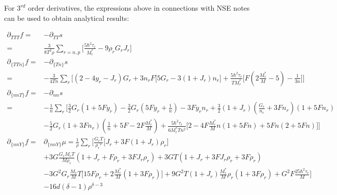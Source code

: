 \documentclass[preprint,prc,preprintnumbers,superscriptaddress,amsmath,amssymb,floatfix]{revtex4-1}
\begin{document}
For $3^{rd}$ order derivatives, the expressions above in connections with NSE notes can be used to obtain analytical results:
\begin{mdframed}
\begin{equation}
 \begin{split}
  \partial_{TTT}f=&-\partial_{TT}s\\
=&\frac{3}{8T^2\rho}\sum_{r={n,p}}\big[\frac{5\hbar^2\tau_r}{M_r^{*}}-9\rho_rG_r J_r\big]\\
  \partial_{\{TTn\}}f=&-\partial_{\{Tn\}}s\\
  =&-\frac{3}{4T n}\sum_r\Big[(2-4y_r-J_r)G_r+3n_r F\big[5G_r-3(1+J_r)n_r\big]+\frac{5\hbar^2\tau_r}{TM_r^{*}}\big[F(2\frac{M^{*}_r}{M}-5)-\frac{1}{3n}\big]\Big]\\
  \partial_{\{nnT\}}f=&-\partial_{nn}s\\
  =&-\frac{1}{n}\sum_r \Big[\frac{3}{2} {G_r} (1+5 F {y_r})-\frac{3}{2} {G_r}(5 F {y_r}+\frac{1}{n })-3 F {y_r} {n_r}+\frac{3}{2} (1+{J_r}) (\frac{{G_r}}{{n_r}}+3 F {n_r}) (1+5 F {n_r})\\
 &-\frac{5}{2} G_r (1+ 3 F n_r)(\frac{1}{n}+5 F-2 F \frac{M_r^{*}}{M})+\frac{5 \hbar^2 \tau_r}{6 M_r^{*} T n^2}\big[2-4 F \frac{M_r^{*}}{M}n (1+5 F n)+5 F n (2 + 5 F n)\big]\Big]\\
 \partial_{\{nnY\}}f=&\partial_{\{nnY\}}\mu=\frac{1}{\rho}\sum_r\Big[\frac{{G_r} T}{{\rho_r}^2} \big[{J_r}+3 F (1+{J_r}) {\rho_r}\big]\\
  &+3G\frac{ {G_r} {M_r} T}{M \rho_r} (1+{J_r}+F {\rho_r}+3 F {J_r} {\rho_r})+3 GT(1+J_r+3 FJ_r\rho_r+3 F\rho_r)\\
  &-3 G^2 G_r \frac{M_r}{M}T\big[15 F \rho_r+2\frac{M_r^{*}}{M}(1+3F\rho_r)\big]+9G^2T(1+J_r)\frac{M_r^{*}}{M}\rho_r(1+3 F \rho_r)+G^2F\frac{25 \hbar^2\tau_r}{M}\Big]\\
  &-16 d (\delta -1) \rho^{\delta -3}\\
 \end{split}
\end{equation} 
\end{mdframed}
\end{document}
